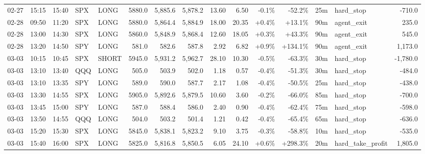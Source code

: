 \documentclass[11pt,a4paper,twoside]{article}
\begin{document}
\begin{landscape}
\begin{center}
\begin{longtable}{>{\color{txtmain}}l l l l l r r r r r r r r >{\color{txtmain}}l r}
02-27 & 15:15 & 15:40 & SPX & LONG & 5880.0 & 5,885.6 & 5,878.2 & 13.60 & 6.50 & \textcolor{lossred}{-0.1\%} & \textcolor{lossred}{-52.2\%} & 25m & hard\_stop & \textcolor{lossred}{-710.0} \\
02-28 & 09:50 & 11:20 & SPX & LONG & 5880.0 & 5,864.4 & 5,884.9 & 18.00 & 20.35 & \textcolor{wingreen}{+0.4\%} & \textcolor{wingreen}{+13.1\%} & 90m & agent\_exit & \textcolor{wingreen}{235.0} \\
02-28 & 13:00 & 14:30 & SPX & LONG & 5860.0 & 5,848.9 & 5,868.4 & 12.60 & 18.05 & \textcolor{wingreen}{+0.3\%} & \textcolor{wingreen}{+43.3\%} & 90m & agent\_exit & \textcolor{wingreen}{545.0} \\
02-28 & 13:20 & 14:50 & SPY & LONG & 581.0 & 582.6 & 587.8 & 2.92 & 6.82 & \textcolor{wingreen}{+0.9\%} & \textcolor{wingreen}{+134.1\%} & 90m & agent\_exit & \textcolor{wingreen}{1,173.0} \\
03-03 & 10:15 & 10:45 & SPX & SHORT & 5945.0 & 5,931.2 & 5,962.7 & 28.10 & 10.30 & \textcolor{lossred}{-0.5\%} & \textcolor{lossred}{-63.3\%} & 30m & hard\_stop & \textcolor{lossred}{-1,780.0} \\
03-03 & 13:10 & 13:40 & QQQ & LONG & 505.0 & 503.9 & 502.0 & 1.18 & 0.57 & \textcolor{lossred}{-0.4\%} & \textcolor{lossred}{-51.3\%} & 30m & hard\_stop & \textcolor{lossred}{-484.0} \\
03-03 & 13:10 & 13:35 & SPY & LONG & 589.0 & 590.0 & 587.7 & 2.17 & 1.08 & \textcolor{lossred}{-0.4\%} & \textcolor{lossred}{-50.5\%} & 25m & hard\_stop & \textcolor{lossred}{-438.0} \\
03-03 & 13:30 & 14:55 & SPX & LONG & 5905.0 & 5,892.6 & 5,879.5 & 10.60 & 3.60 & \textcolor{lossred}{-0.2\%} & \textcolor{lossred}{-66.0\%} & 85m & hard\_stop & \textcolor{lossred}{-700.0} \\
03-03 & 13:45 & 15:00 & SPY & LONG & 587.0 & 588.4 & 586.0 & 2.40 & 0.90 & \textcolor{lossred}{-0.4\%} & \textcolor{lossred}{-62.4\%} & 75m & hard\_stop & \textcolor{lossred}{-598.0} \\
03-03 & 13:50 & 14:55 & QQQ & LONG & 504.0 & 503.2 & 501.4 & 1.21 & 0.42 & \textcolor{lossred}{-0.4\%} & \textcolor{lossred}{-65.4\%} & 65m & hard\_stop & \textcolor{lossred}{-636.0} \\
03-03 & 15:20 & 15:30 & SPX & LONG & 5845.0 & 5,838.1 & 5,823.2 & 9.10 & 3.75 & \textcolor{lossred}{-0.3\%} & \textcolor{lossred}{-58.8\%} & 10m & hard\_stop & \textcolor{lossred}{-535.0} \\
03-03 & 15:40 & 16:00 & SPX & LONG & 5825.0 & 5,816.8 & 5,850.5 & 6.05 & 24.10 & \textcolor{wingreen}{+0.6\%} & \textcolor{wingreen}{+298.3\%} & 20m & hard\_take\_profit & \textcolor{wingreen}{1,805.0} \\

\end{longtable}
\end{center}
\end{landscape}
\end{document}
